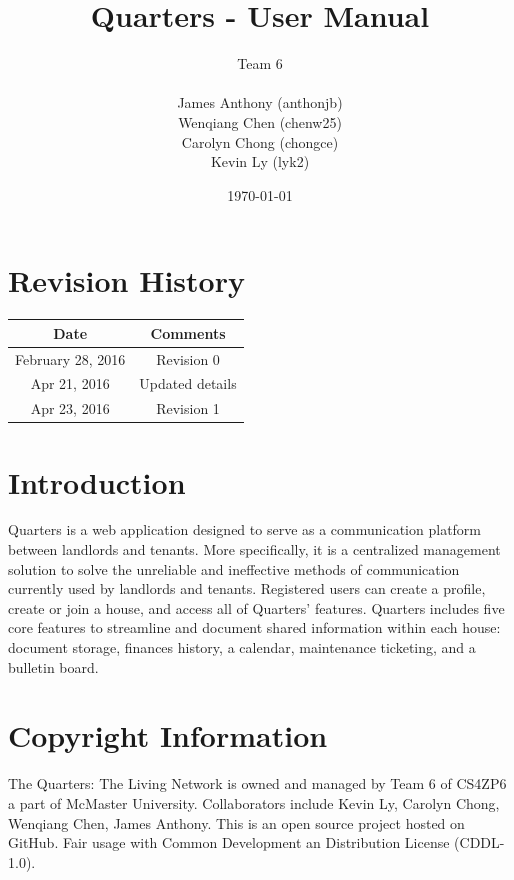 \documentclass[12pt]{article}
\begin{document}
    \title{Quarters - User Manual}
    \author{Team 6\\ \\James Anthony (anthonjb)\\ Wenqiang Chen (chenw25)\\ Carolyn Chong
        (chongce)\\ Kevin Ly (lyk2)}
    \date{\today}

    \maketitle

    \pagebreak

    \tableofcontents
    \listoffigures

    \section*{Revision History}
    \begin{tabular}{|c|c|}
        \hline
        \textbf{Date}  & \textbf{Comments} \\ \hline
        February 28, 2016 & Revision 0 \\ \hline
        Apr 21, 2016 & Updated details \\ \hline
        Apr 23, 2016 & Revision 1 \\ \hline
    \end{tabular}

    \pagebreak


    \section{Introduction}
	Quarters is a web application designed to serve as a communication platform between landlords and tenants. More specifically, it is a centralized management solution to solve the unreliable and ineffective methods of communication currently used by landlords and tenants. Registered users can create a profile, create or join a house, and access all of Quarters’ features. Quarters includes five core features to streamline and document shared information within each house: document storage, finances history, a calendar, maintenance ticketing, and a bulletin board.

    \section{Copyright Information}
    The Quarters: The Living Network is owned and managed by Team 6 of CS4ZP6 a part of McMaster University. Collaborators include Kevin Ly, Carolyn Chong, Wenqiang Chen, James Anthony. This is an open source project hosted on GitHub. Fair usage with Common Development an Distribution License (CDDL-1.0).
\end{document}
